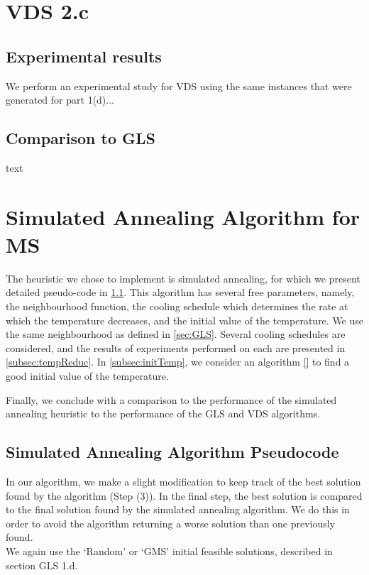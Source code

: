 \documentclass[12pt,a4paper,reqno]{article}
\begin{document}
\section*{VDS 2.c}
\subsection*{Experimental results}
We perform an experimental study for VDS using the same instances that were generated for part 1(d)...

\subsection*{Comparison to GLS}
text

\newpage
\section{Simulated Annealing Algorithm for MS}
\label{sec:simulatedannealing}

The heuristic we chose to implement is simulated annealing, for which we present detailed pseudo-code in \ref{subsec:SA_pseudo}. This algorithm has several free parameters, namely, the neighbourhood function, the cooling schedule which determines the rate at which the temperature decreases, and the initial value of the temperature. We use the same neighbourhood as defined in \ref{sec:GLS}. Several cooling schedules are considered, and the results of experiments performed on each are presented in \ref{subsec:tempReduc}. In \ref{subsec:initTemp}, we consider an algorithm \ref{} to find a good initial value of the temperature.

Finally, we conclude with a comparison to the performance of the simulated annealing heuristic to the performance of the GLS and VDS algorithms.

\subsection{Simulated Annealing Algorithm Pseudocode}
\label{subsec:SA_pseudo}
In our algorithm, we make a slight modification to keep track of the best solution found by the algorithm (Step (3)). In the final step, the best solution is compared to the final solution found by the simulated annealing algorithm. We do this in order to avoid the algorithm returning a worse solution than one previously found. \\

We again use the `Random' or `GMS' initial feasible solutions, described in section GLS 1.d. \\
\end{document}
